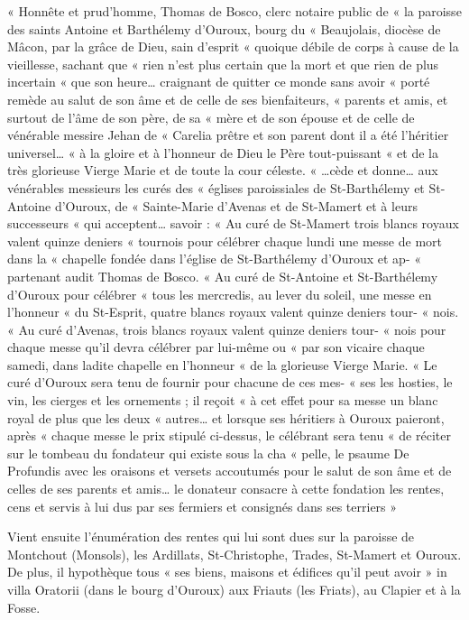 « Honnête et prud'homme, Thomas de Bosco, clerc notaire public de  
« la paroisse des saints Antoine et Barthélemy d'Ouroux, bourg du  
« Beaujolais, diocèse de Mâcon, par la grâce de Dieu, sain d'esprit  
« quoique débile de corps à cause de la vieillesse, sachant que  
« rien n'est plus certain que la mort et que rien de plus incertain  
« que son heure… craignant de quitter ce monde sans avoir  
« porté remède au salut de son âme et de celle de ses bienfaiteurs,  
« parents et amis, et surtout de l'âme de son père, de sa  
« mère et de son épouse et de celle de vénérable messire Jehan de  
« Carelia prêtre et son parent dont il a été l'héritier universel…  
« à la gloire et à l'honneur de Dieu le Père tout-puissant  
« et de la très glorieuse Vierge Marie et de toute la cour céleste.  
« …cède et donne… aux vénérables messieurs les curés des  
« églises paroissiales de St-Barthélemy et St-Antoine d'Ouroux, de  
« Sainte-Marie d'Avenas et de St-Mamert et à leurs successeurs  
« qui acceptent… savoir :  
« Au curé de St-Mamert trois blancs royaux valent quinze deniers  
« tournois pour célébrer chaque lundi une messe de mort dans la  
« chapelle fondée dans l'église de St-Barthélemy d'Ouroux et ap-  
« partenant audit Thomas de Bosco.  
« Au curé de St-Antoine et St-Barthélemy d'Ouroux pour célébrer  
« tous les mercredis, au lever du soleil, une messe en l'honneur  
« du St-Esprit, quatre blancs royaux valent quinze deniers tour-  
« nois.  
« Au curé d'Avenas, trois blancs royaux valent quinze deniers tour-  
« nois pour chaque messe qu'il devra célébrer par lui-même ou  
« par son vicaire chaque samedi, dans ladite chapelle en l'honneur  
« de la glorieuse Vierge Marie.  
« Le curé d'Ouroux sera tenu de fournir pour chacune de ces mes-  
« ses les hosties, le vin, les cierges et les ornements ; il reçoit  
« à cet effet pour sa messe un blanc royal de plus que les deux  
« autres… et lorsque ses héritiers à Ouroux paieront, après  
« chaque messe le prix stipulé ci-dessus, le célébrant sera tenu  
« de réciter sur le tombeau du fondateur qui existe sous la cha
« pelle, le psaume De Profundis avec les oraisons et versets accoutumés pour le salut de son âme et de celles de ses parents et amis… le donateur consacre à cette fondation les rentes, cens et servis à lui dus par ses fermiers et consignés dans ses terriers »

Vient ensuite l'énumération des rentes qui lui sont dues sur la paroisse de Montchout (Monsols), les Ardillats, St-Christophe, Trades, St-Mamert et Ouroux. De plus, il hypothèque tous « ses biens, maisons et édifices qu'il peut avoir » in villa Oratorii (dans le bourg d'Ouroux) aux Friauts (les Friats), au Clapier et à la Fosse.

